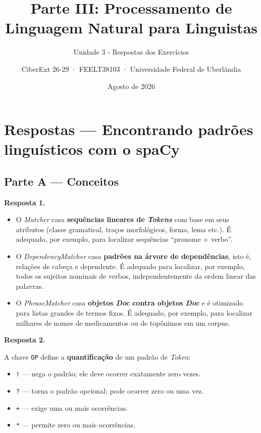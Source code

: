 \documentclass[
  brazilian,
]{article}
\title{Parte III: Processamento de Linguagem Natural para Linguistas}
\subtitle{Unidade 3 - Respostas dos Exercícios}
\author{CiberExt 26-29 · FEELT38103 · Universidade Federal de
Uberlândia}
\date{Agosto de 2026}
\providecommand{\tightlist}{%
  \setlength{\itemsep}{0pt}\setlength{\parskip}{0pt}}
\begin{document}
\maketitle

\hypertarget{respostas-encontrando-padruxf5es-linguuxedsticos-com-o-spacy}{%
\section{Respostas --- Encontrando padrões linguísticos com o
spaCy}\label{respostas-encontrando-padruxf5es-linguuxedsticos-com-o-spacy}}

\hypertarget{parte-a-conceitos}{%
\subsection{Parte A --- Conceitos}\label{parte-a-conceitos}}

\textbf{Resposta 1.}

\begin{itemize}
\tightlist
\item
  O \emph{Matcher} casa \textbf{sequências lineares de \emph{Tokens}}
  com base em seus atributos (classe gramatical, traços morfológicos,
  forma, lema etc.). É adequado, por exemplo, para localizar sequências
  ``pronome + verbo''.
\item
  O \emph{DependencyMatcher} casa \textbf{padrões na árvore de
  dependências}, isto é, relações de cabeça e dependente. É adequado
  para localizar, por exemplo, todos os sujeitos nominais de verbos,
  independentemente da ordem linear das palavras.
\item
  O \emph{PhraseMatcher} casa \textbf{objetos \emph{Doc} contra objetos
  \emph{Doc}} e é otimizado para listas grandes de termos fixos. É
  adequado, por exemplo, para localizar milhares de nomes de
  medicamentos ou de topônimos em um corpus.
\end{itemize}

\textbf{Resposta 2.}

A chave \texttt{OP} define a \textbf{quantificação} de um padrão de
\emph{Token}:

\begin{itemize}
\tightlist
\item
  \texttt{!} --- nega o padrão; ele deve ocorrer exatamente zero vezes.
\item
  \texttt{?} --- torna o padrão opcional; pode ocorrer zero ou uma vez.
\item
  \texttt{+} --- exige uma ou mais ocorrências.
\item
  \texttt{*} --- permite zero ou mais ocorrências.
\end{itemize}
\end{document}
